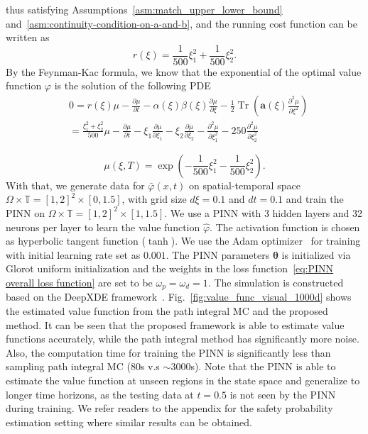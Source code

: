 \documentclass[letterpaper]{article} %
\begin{document}
thus satisfying Assumptions~\ref{asm:match_upper_lower_bound} and~\ref{asm:continuity-condition-on-a-and-b}, and the running cost function can be written as
\begin{equation} \label{eq: r_xi_1000d}
    r(\xi) = \frac{1}{500}\xi_1^2 + \frac{1}{500}\xi_2^2.
\end{equation}
By the Feynman-Kac formula, we know that the exponential of the optimal value function $\varphi$ is the solution of the following PDE
\begin{align}
    & 0 = r(\xi)\mu
    - \frac{\partial \mu}{\partial t} -
    \alpha(\xi) \beta(\xi) \frac{\partial \mu}{\partial \xi} - \frac{1}{2} \operatorname{Tr} \left(
    \mathbf{a}(\xi) \frac{\partial^2 \mu}{\partial \xi^2} \right) \\
    & = \frac{\xi_1^2 + \xi_2^2}{500}\mu - \frac{\partial \mu}{\partial t} - \xi_1 \frac{\partial \mu}{\partial \xi_1} - \xi_2 \frac{\partial \mu}{\partial \xi_2} - \frac{\partial^2 \mu}{\partial \xi_1^2} - 250 \frac{\partial^2 \mu}{\partial \xi_2^2} \nonumber
\end{align}

\begin{equation}
    \mu(\xi, T) = \exp(- \frac{1}{500}\xi_1^2 - \frac{1}{500}\xi_2^2).
\end{equation}
With that, we generate data for $\bar \varphi(x,t)$ on spatial-temporal space $\Omega \times \mathbb{T} = [1,2]^2 \times [0,1.5]$, with grid size $d\xi = 0.1$ and $dt = 0.1$ and train the PINN on $\Omega \times \mathbb{T} = [1,2]^2 \times [1,1.5]$.
We use a PINN with 3 hidden layers and 32 neurons per layer to learn the value function $\hat \varphi$. The activation function is chosen as hyperbolic tangent function ($\tanh$). We use the Adam optimizer~\cite{kingma2014adam} for training with initial learning rate set as $0.001$. The PINN parameters $\boldsymbol\theta$ is initialized via Glorot uniform initialization and the weights in the loss function~\eqref{eq:PINN overall loss function} are set to be $\omega_p = \omega_d = 1$. The simulation is constructed based on the DeepXDE framework~\cite{lu2021deepxde}. Fig.~\ref{fig:value_func_visual_1000d} shows the estimated value function from the path integral MC and the proposed method. It can be seen that the proposed framework is able to estimate value functions accurately, while the path integral method has significantly more noise. Also, the computation time for training the PINN is significantly less than sampling path integral MC (80s v.s $\sim$3000s). Note that the PINN is able to estimate the value function at unseen regions in the state space and generalize to longer time horizons, as the testing data at $t = 0.5$ is not seen by the PINN during training.
We refer readers to the appendix for the safety probability estimation setting where similar results can be obtained.
\end{document}
